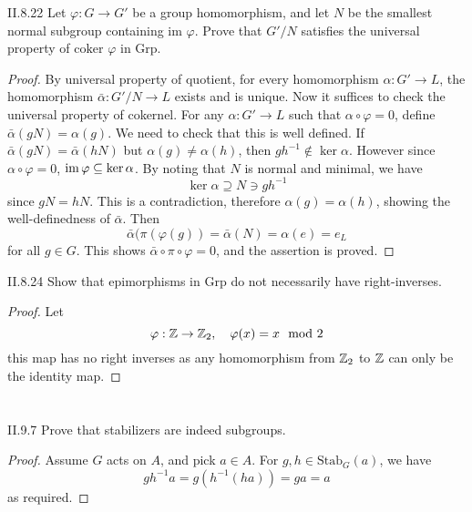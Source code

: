 \begin{problem}{II.8.22}
Let $\varphi:G \to G'$ be a group homomorphism, and let $N$ be the smallest normal subgroup containing im $\varphi$. Prove that $G'/N$ satisfies the universal property of $\text{coker }\varphi$ in \textsf{Grp}.
\end{problem}
\begin{proof}
By universal property of quotient, for every homomorphism $\alpha : G' \to L$,  the homomorphism $\bar{\alpha} : G'/N \to L$ exists and is unique. Now it suffices to check the universal property of cokernel. For any $\alpha : G' \to L$ such that $\alpha \circ \varphi = 0$, define $\bar{\alpha}(gN) = \alpha(g)$. We need to check that this is well defined. If $\bar{\alpha}(gN) = \bar{\alpha}(hN)$ but $\alpha(g) \neq \alpha(h)$, then $gh^{-1} \notin \ker \alpha$. However since $\alpha \circ \varphi = 0$, $\operatorname{im} \varphi \subseteq \ker \alpha$. By noting that $N$ is normal and minimal, we have \[
\ker \alpha \supseteq N \ni gh^{-1}
\]
since $gN = hN$. This is a contradiction, therefore $\alpha(g) = \alpha(h)$, showing the well-definedness of $\bar{\alpha}$. Then
\[
\bar{\alpha}(\pi(\varphi(g)) = \bar{\alpha}(N) = \alpha(e) = e_L
\]
for all $g \in G$. This shows $\bar{\alpha} \circ \pi \circ \varphi = 0$, and the assertion is proved.
\end{proof}

\begin{problem}{II.8.24}
Show that epimorphisms in \textsf{Grp} do not necessarily have right-inverses.
\end{problem}
\begin{proof}
Let 
\[
\varphi : \mathbb{Z} \to \mathbb{Z}_2, \quad \varphi(x) = x\mod 2
\]
this map has no right inverses as any homomorphism from $\mathbb{Z}_2$ to $\mathbb{Z}$ can only be the identity map.
\end{proof}

\section{}

\begin{problem}{II.9.7}
Prove that stabilizers are indeed subgroups.
\end{problem}
\begin{proof}
Assume $G$ acts on $A$, and pick $a \in A$. For $g,h \in \text{Stab}_G(a)$, we have
\[
gh^{-1}a = g(h^{-1}(ha)) = ga = a
\]
as required.
\end{proof}

